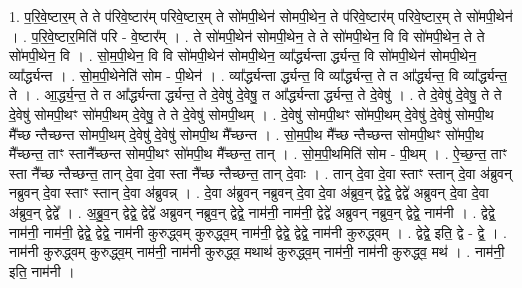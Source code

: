 \documentclass[17pt]{extarticle}
\begin{document}
1. प॒रि॒वे॒ष्टार॒म् ते ते प॑रिवे॒ष्टार॑म् परिवे॒ष्टार॒म् ते सो॑मपी॒थेन॑ सोमपी॒थेन॒ ते प॑रिवे॒ष्टार॑म् परिवे॒ष्टार॒म् ते सो॑मपी॒थेन॑ । . प॒रि॒वे॒ष्टार॒मिति॑ परि - वे॒ष्टार᳚म् । . ते सो॑मपी॒थेन॑ सोमपी॒थेन॒ ते ते सो॑मपी॒थेन॒ वि वि सो॑मपी॒थेन॒ ते ते सो॑मपी॒थेन॒ वि । . सो॒म॒पी॒थेन॒ वि वि सो॑मपी॒थेन॑ सोमपी॒थेन॒ व्या᳚र्द्ध्यन्ता र्द्ध्यन्त॒ वि सो॑मपी॒थेन॑ सोमपी॒थेन॒ व्या᳚र्द्ध्यन्त । . सो॒म॒पी॒थेनेति॑ सोम - पी॒थेन॑ । . व्या᳚र्द्ध्यन्ता र्द्ध्यन्त॒ वि व्या᳚र्द्ध्यन्त॒ ते त आ᳚र्द्ध्यन्त॒ वि व्या᳚र्द्ध्यन्त॒ ते । . आ॒र्द्ध्य॒न्त॒ ते त आ᳚र्द्ध्यन्ता र्द्ध्यन्त॒ ते दे॒वेषु॑ दे॒वेषु॒ त आ᳚र्द्ध्यन्ता र्द्ध्यन्त॒ ते दे॒वेषु॑ । . ते दे॒वेषु॑ दे॒वेषु॒ ते ते दे॒वेषु॑ सोमपी॒थꣳ सो॑मपी॒थम् दे॒वेषु॒ ते ते दे॒वेषु॑ सोमपी॒थम् । . दे॒वेषु॑ सोमपी॒थꣳ सो॑मपी॒थम् दे॒वेषु॑ दे॒वेषु॑ सोमपी॒थ मै᳚च्छ न्तैच्छन्त सोमपी॒थम् दे॒वेषु॑ दे॒वेषु॑ सोमपी॒थ मै᳚च्छन्त । . सो॒म॒पी॒थ मै᳚च्छ न्तैच्छन्त सोमपी॒थꣳ सो॑मपी॒थ मै᳚च्छन्त॒ ताꣳ स्तानै᳚च्छन्त सोमपी॒थꣳ सो॑मपी॒थ मै᳚च्छन्त॒ तान् । . सो॒म॒पी॒थमिति॑ सोम - पी॒थम् । . ऐ॒च्छ॒न्त॒ ताꣳ स्ता नै᳚च्छ न्तैच्छन्त॒ तान् दे॒वा दे॒वा स्ता नै᳚च्छ न्तैच्छन्त॒ तान् दे॒वाः । . तान् दे॒वा दे॒वा स्ताꣳ स्तान् दे॒वा अ॑ब्रुवन् नब्रुवन् दे॒वा स्ताꣳ स्तान् दे॒वा अ॑ब्रुवन्न् । . दे॒वा अ॑ब्रुवन् नब्रुवन् दे॒वा दे॒वा अ॑ब्रुव॒न् द्वेद्वे॒ द्वेद्वे॑ अब्रुवन् दे॒वा दे॒वा अ॑ब्रुव॒न् द्वेद्वे᳚ । . अ॒ब्रु॒व॒न् द्वेद्वे॒ द्वेद्वे॑ अब्रुवन् नब्रुव॒न् द्वेद्वे॒ नाम॑नी॒ नाम॑नी॒ द्वेद्वे॑ अब्रुवन् नब्रुव॒न् द्वेद्वे॒ नाम॑नी । . द्वेद्वे॒ नाम॑नी॒ नाम॑नी॒ द्वेद्वे॒ द्वेद्वे॒ नाम॑नी कुरुद्ध्वम् कुरुद्ध्व॒म् नाम॑नी॒ द्वेद्वे॒ द्वेद्वे॒ नाम॑नी कुरुद्ध्वम् । . द्वेद्वे॒ इति॒ द्वे - द्वे॒ । . नाम॑नी कुरुद्ध्वम् कुरुद्ध्व॒म् नाम॑नी॒ नाम॑नी कुरुद्ध्व॒ मथाथ॑ कुरुद्ध्व॒म् नाम॑नी॒ नाम॑नी कुरुद्ध्व॒ मथ॑ । . नाम॑नी॒ इति॒ नाम॑नी । \newline
\end{document}
